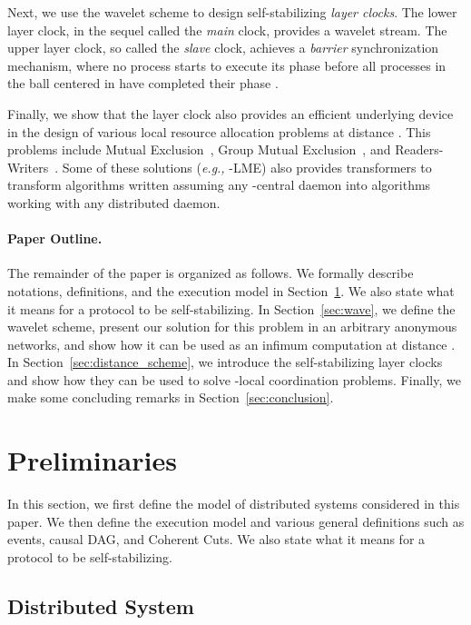 \documentclass[11pt]{article}
\newcommand{\eg}{\emph{e.g., }}
\begin{document}
Next, we use the wavelet scheme to design self-stabilizing \emph{layer clocks}.
The lower layer clock, in the sequel called the \emph{main} clock, provides a wavelet stream. 
The upper layer clock, so called the \emph{slave} clock, achieves a \emph{barrier} synchronization
mechanism, where no process  starts 
to execute its phase  before all processes in the ball centered in  have completed their phase .

Finally, we show that the layer clock also provides an efficient underlying device in the design of 
various local resource allocation problems at distance .  This problems include
Mutual Exclusion~\cite{D65}, Group Mutual Exclusion~\cite{Jou00}, and Readers-Writers~\cite{CHP71}.
Some of these solutions (\eg -LME) also provides transformers 
to transform algorithms written assuming any -central daemon into algorithms working 
with any distributed daemon.


\paragraph{Paper Outline.}

The remainder of the paper is organized as follows. 
We formally describe notations, definitions, and the execution model in Section~\ref{sec:prel}. We also 
state what it means for a protocol to be self-stabilizing. 
In Section~\ref{sec:wave}, we define the wavelet scheme, present our solution for this problem in an arbitrary anonymous networks, 
and show how it can be used as an infimum computation at distance . 
In Section~\ref{sec:distance_scheme},  we introduce the self-stabilizing layer clocks and show how they can be used 
to solve -local coordination problems. Finally, we make some concluding remarks in Section~\ref{sec:conclusion}.

\section{Preliminaries}
\label{sec:prel}

In this section, we first define the model of distributed systems 
considered in this paper.  We then define the execution model and various general definitions such as events, causal DAG, and Coherent Cuts.
We also state what it means for a protocol to be self-stabilizing.  

\subsection{Distributed System}
\end{document}
